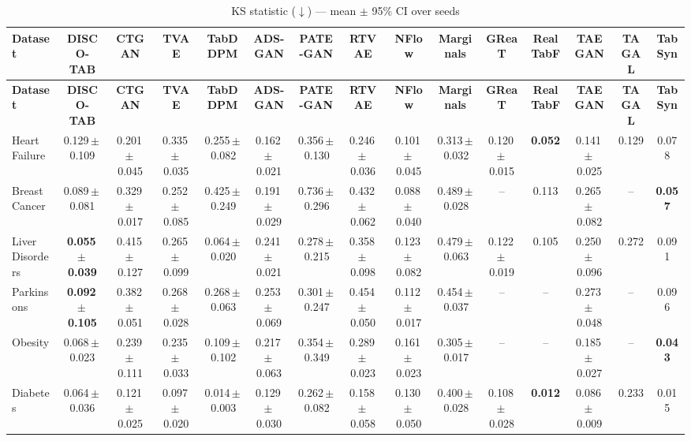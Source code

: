 \documentclass[8pt]{extarticle}
\begin{document}
\begin{longtable}{l*{14}{c}}
\caption{KS statistic ($\downarrow$) --- mean $\pm$ 95\% CI over seeds}\\
\toprule
\textbf{Dataset} & \textbf{DISCO-TAB} & \textbf{CTGAN} & \textbf{TVAE} & \textbf{TabDDPM} & \textbf{ADS-GAN} & \textbf{PATE-GAN} & \textbf{RTVAE} & \textbf{NFlow} & \textbf{Marginals} & \textbf{GReaT} & \textbf{RealTabF} & \textbf{TAEGAN} & \textbf{TAGAL} & \textbf{TabSyn} \\
\midrule
\endfirsthead
\toprule
\textbf{Dataset} & \textbf{DISCO-TAB} & \textbf{CTGAN} & \textbf{TVAE} & \textbf{TabDDPM} & \textbf{ADS-GAN} & \textbf{PATE-GAN} & \textbf{RTVAE} & \textbf{NFlow} & \textbf{Marginals} & \textbf{GReaT} & \textbf{RealTabF} & \textbf{TAEGAN} & \textbf{TAGAL} & \textbf{TabSyn} \\
\midrule
\endhead
\bottomrule
\endfoot
Heart Failure & 0.129\,$\pm$\,0.109 & 0.201\,$\pm$\,0.045 & 0.335\,$\pm$\,0.035 & 0.255\,$\pm$\,0.082 & 0.162\,$\pm$\,0.021 & 0.356\,$\pm$\,0.130 & 0.246\,$\pm$\,0.036 & 0.101\,$\pm$\,0.045 & 0.313\,$\pm$\,0.032 & 0.120\,$\pm$\,0.015 & \textbf{0.052} & 0.141\,$\pm$\,0.025 & 0.129 & 0.078 \\
Breast Cancer & 0.089\,$\pm$\,0.081 & 0.329\,$\pm$\,0.017 & 0.252\,$\pm$\,0.085 & 0.425\,$\pm$\,0.249 & 0.191\,$\pm$\,0.029 & 0.736\,$\pm$\,0.296 & 0.432\,$\pm$\,0.062 & 0.088\,$\pm$\,0.040 & 0.489\,$\pm$\,0.028 & -- & 0.113 & 0.265\,$\pm$\,0.082 & -- & \textbf{0.057} \\
Liver Disorders & \textbf{0.055\,$\pm$\,0.039} & 0.415\,$\pm$\,0.127 & 0.265\,$\pm$\,0.099 & 0.064\,$\pm$\,0.020 & 0.241\,$\pm$\,0.021 & 0.278\,$\pm$\,0.215 & 0.358\,$\pm$\,0.098 & 0.123\,$\pm$\,0.082 & 0.479\,$\pm$\,0.063 & 0.122\,$\pm$\,0.019 & 0.105 & 0.250\,$\pm$\,0.096 & 0.272 & 0.091 \\
Parkinsons & \textbf{0.092\,$\pm$\,0.105} & 0.382\,$\pm$\,0.051 & 0.268\,$\pm$\,0.028 & 0.268\,$\pm$\,0.063 & 0.253\,$\pm$\,0.069 & 0.301\,$\pm$\,0.247 & 0.454\,$\pm$\,0.050 & 0.112\,$\pm$\,0.017 & 0.454\,$\pm$\,0.037 & -- & -- & 0.273\,$\pm$\,0.048 & -- & 0.096 \\
Obesity & 0.068\,$\pm$\,0.023 & 0.239\,$\pm$\,0.111 & 0.235\,$\pm$\,0.033 & 0.109\,$\pm$\,0.102 & 0.217\,$\pm$\,0.063 & 0.354\,$\pm$\,0.349 & 0.289\,$\pm$\,0.023 & 0.161\,$\pm$\,0.023 & 0.305\,$\pm$\,0.017 & -- & -- & 0.185\,$\pm$\,0.027 & -- & \textbf{0.043} \\
Diabetes & 0.064\,$\pm$\,0.036 & 0.121\,$\pm$\,0.025 & 0.097\,$\pm$\,0.020 & 0.014\,$\pm$\,0.003 & 0.129\,$\pm$\,0.030 & 0.262\,$\pm$\,0.082 & 0.158\,$\pm$\,0.058 & 0.130\,$\pm$\,0.050 & 0.400\,$\pm$\,0.028 & 0.108\,$\pm$\,0.028 & \textbf{0.012} & 0.086\,$\pm$\,0.009 & 0.233 & 0.015 \\

\end{longtable}
\end{document}

